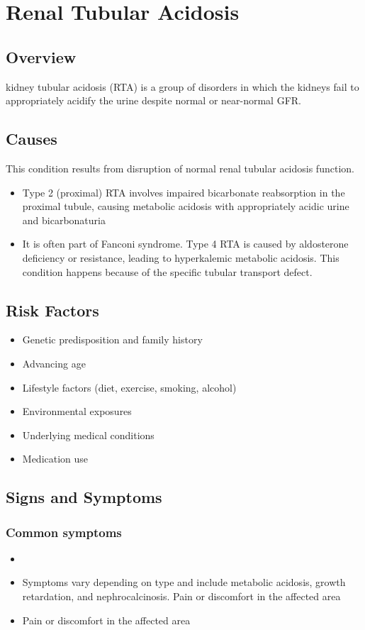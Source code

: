 \chapter{Renal Tubular Acidosis}
\label{sec:Renal Tubular Acidosis}

\section{Overview}
kidney tubular acidosis (RTA) is a group of disorders in which the kidneys fail to appropriately acidify the urine despite normal or near-normal GFR.
\section{Causes}
This condition results from disruption of normal renal tubular acidosis function.

\begin{itemize}[noitemsep]
  \item Type 2 (proximal) RTA involves impaired bicarbonate reabsorption in the proximal tubule, causing metabolic acidosis with appropriately acidic urine and bicarbonaturia
  \item It is often part of Fanconi syndrome. Type 4 RTA is caused by aldosterone deficiency or resistance, leading to hyperkalemic metabolic acidosis. This condition happens because of the specific tubular transport defect.
\end{itemize}
\section{Risk Factors}


\begin{itemize}[noitemsep]
  \item Genetic predisposition and family history
  \item Advancing age
  \item Lifestyle factors (diet, exercise, smoking, alcohol)
  \item Environmental exposures
  \item Underlying medical conditions
  \item Medication use
\end{itemize}
\section{Signs and Symptoms}

\subsection{Common symptoms}
\begin{itemize}[noitemsep]
  \item \item Symptoms vary depending on type and include metabolic acidosis, growth retardation, and nephrocalcinosis. Pain or discomfort in the affected area    \item Pain or discomfort in the affected area
  \end{itemize}

